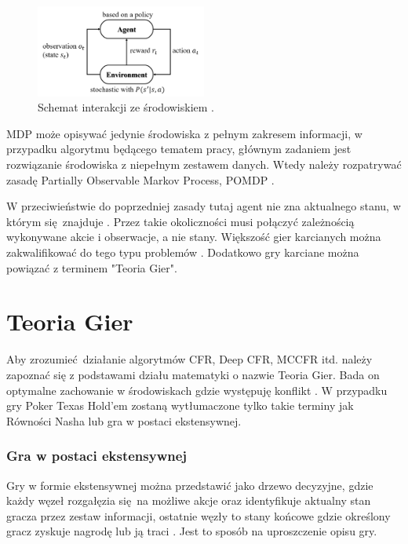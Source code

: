 \documentclass[12pt,oneside,a4paper]{report}
\begin{document}
\begin{figure}[th!]
            \center
           \includegraphics[width=0.5\textwidth]{./img/MDP.png}
           \caption{Schemat interakcji ze środowiskiem \cite{mdp}.}
\end{figure}


MDP może opisywać jedynie środowiska z pełnym zakresem informacji, w przypadku algorytmu będącego
tematem pracy, głównym zadaniem jest rozwiązanie środowiska z niepełnym zestawem danych. Wtedy 
należy rozpatrywać zasadę Partially Observable Markov Process, POMDP \cite{mdp}.


\vspace{2cm}
W przeciwieństwie do poprzedniej zasady tutaj agent nie zna aktualnego stanu, w którym
się znajduje \cite{mdp}. Przez takie okoliczności musi połączyć zależnością wykonywane akcie i
obserwacje, a nie stany. Większość gier karcianych można zakwalifikować do tego typu problemów
\cite{mdp}. Dodatkowo gry karciane można powiązać z terminem "Teoria Gier".

\section{Teoria Gier}

Aby zrozumieć działanie algorytmów CFR, Deep CFR, MCCFR itd. należy zapoznać się
z podstawami działu matematyki o nazwie Teoria Gier. Bada on optymalne zachowanie w środowiskach gdzie
występuję konflikt \cite{gt}. W przypadku gry Poker Texas
Hold'em zostaną wytłumaczone tylko takie terminy jak Równości Nasha lub
gra w postaci ekstensywnej.

\subsubsection{Gra w postaci ekstensywnej}

Gry w
formie ekstensywnej można przedstawić jako drzewo decyzyjne, gdzie każdy węzeł rozgałęzia się na
możliwe akcje oraz identyfikuje aktualny stan gracza przez zestaw informacji,
ostatnie węzły to stany końcowe gdzie określony gracz zyskuje nagrodę lub ją traci \cite{gt}.
Jest to sposób
na uproszczenie opisu gry.
\end{document}
